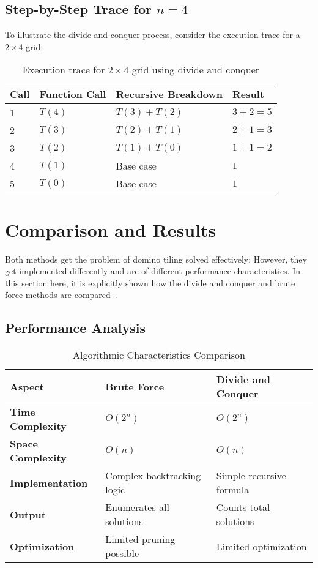 \documentclass[conference]{IEEEtran}
\begin{document}
\subsection{Step-by-Step Trace for $n = 4$}

To illustrate the divide and conquer process, consider the execution trace for a $2 \times 4$ grid:

\begin{table}[htbp]
\centering
\caption{Execution trace for $2 \times 4$ grid using divide and conquer}
\label{tab:dc_trace}
\renewcommand{\arraystretch}{2}
\begin{tabular}{|p{1.5cm}|p{2.0cm}|p{2.0cm}|p{1.5cm}|}
\hline
\textbf{Call} & \textbf{Function Call} & \textbf{Recursive Breakdown} & \textbf{Result} \\
\hline
1 & $T(4)$ & $T(3) + T(2)$ & $3 + 2 = 5$ \\
\hline
2 & $T(3)$ & $T(2) + T(1)$ & $2 + 1 = 3$ \\
\hline
3 & $T(2)$ & $T(1) + T(0)$ & $1 + 1 = 2$ \\
\hline
4 & $T(1)$ & Base case & $1$ \\
\hline
5 & $T(0)$ & Base case & $1$ \\
\hline
\end{tabular}
\end{table}

\section{Comparison and Results}

Both methods get the problem of domino tiling solved effectively; However, they get implemented differently and are of different performance characteristics. In this section here, it is explicitly shown how the divide and conquer and brute force methods are compared~\cite{b4, b5}.

\subsection{Performance Analysis}

\begin{table}[!htbp]
\centering
\caption{Algorithmic Characteristics Comparison}
\label{tab:algorithm_comparison}
\renewcommand{\arraystretch}{1.6}
\begin{tabular}{|p{2.2cm}|p{2cm}|p{2cm}|}
\hline
\textbf{Aspect} & \textbf{Brute Force} & \textbf{Divide and Conquer} \\
\hline
\textbf{Time Complexity} & $O(2^n)$ & $O(2^n)$ \\
\hline
\textbf{Space Complexity} & $O(n)$ & $O(n)$ \\
\hline
\textbf{Implementation} & Complex backtracking logic & Simple recursive formula \\
\hline
\textbf{Output} & Enumerates all solutions & Counts total solutions \\
\hline
\textbf{Optimization} & Limited pruning possible & Limited optimization \\
\hline
\end{tabular}
\end{table}
\end{document}
